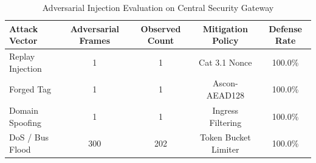 \begin{table}[h]
\centering
\caption{Adversarial Injection Evaluation on Central Security Gateway}
\label{tab:attack_mitigation}
\small
\begin{tabular}{lcccc}
\toprule
\textbf{Attack Vector} & \textbf{Adversarial Frames} & \textbf{Observed Count} & \textbf{Mitigation Policy} & \textbf{Defense Rate} \\
\midrule
Replay Injection & 1 & 1 & Cat 3.1 Nonce & 100.0\% \\
Forged Tag & 1 & 1 & Ascon-AEAD128 & 100.0\% \\
Domain Spoofing & 1 & 1 & Ingress Filtering & 100.0\% \\
DoS / Bus Flood & 300 & 202 & Token Bucket Limiter & 100.0\% \\
\bottomrule
\end{tabular}
\end{table}
